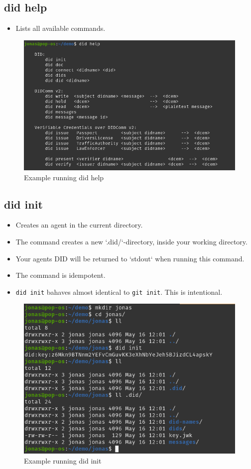 \subsection{did help}
\begin{itemize}
\item Lists all available commands.
\end{itemize}
    \begin{figure}[htbp]
      \centering
      \includegraphics[width=.7\textwidth]{figures/cmd-help.png}
      \caption[]{Example running did help}
    \end{figure}
    
    
    
\subsection{did init}
\begin{itemize}
\item Creates an agent in the current directory.
\item The command creates a new `.did/`-directory, inside your working directory.
\item Your agents DID will be returned to `stdout` when running this command.
\item The command is idempotent.
\item \texttt{did init} bahaves almost identical to \texttt{git init}. This is intentional.
\end{itemize}
    \begin{figure}[htbp]
      \centering
      \includegraphics[width=.7\textwidth]{figures/cmd-init.png}
      \caption[]{Example running did init}
    \end{figure}
    


